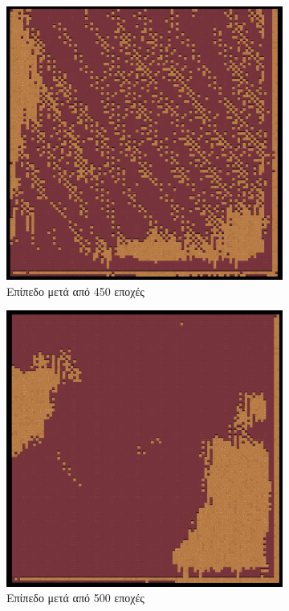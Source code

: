 \begin{figure}[H]
\begin{subfigure}{.5\textwidth}
  \centering
  \includegraphics[width=.8\linewidth]{../images/generated/450.png}
  \caption{Επίπεδο μετά από 450 εποχές}
  \label{fig:sfig1}
\end{subfigure}%
\begin{subfigure}{.5\textwidth}
  \centering
  \includegraphics[width=.8\linewidth]{../images/generated/500.png}
  \caption{Επίπεδο μετά από 500 εποχές}
  \label{fig:sfig2}
\end{subfigure}
\begin{subfigure}{.5\textwidth}

\end{subfigure}
\end{figure}
